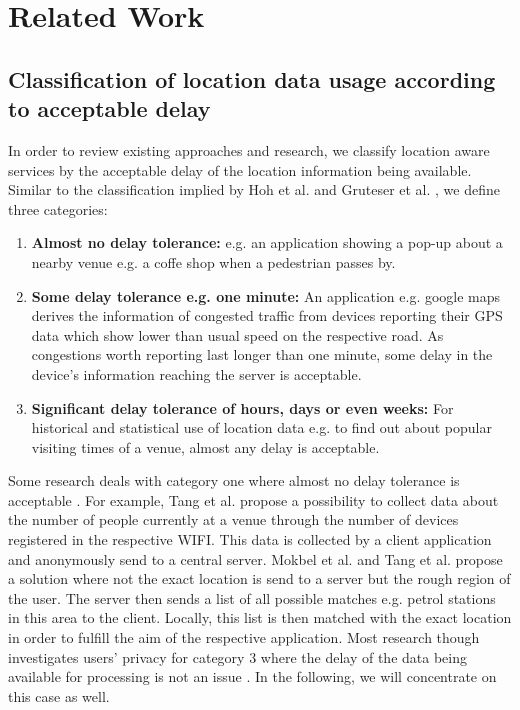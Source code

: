 \chapter{Related Work}\label{chapter:related-work}

\section{Classification of location data usage according to acceptable delay}
In order to review existing approaches and research, we classify location aware services by the acceptable delay of the location information being available. Similar to the classification implied by Hoh et al. \parencite{hoh2005protecting} and Gruteser et al. \parencite{gruteser2003anonymous}, we define three categories:
\begin{enumerate}
  \item \textbf{Almost no delay tolerance:} e.g. an application showing a pop-up about a nearby venue e.g. a coffe shop when a pedestrian passes by.
  \item \textbf{Some delay tolerance e.g. one minute:} An application e.g. google maps derives the information of congested traffic from devices reporting their GPS data which show lower than usual speed on the respective road. As congestions worth reporting last longer than one minute, some delay in the device's information reaching the server is acceptable.
  \item \textbf{Significant delay tolerance of hours, days or even weeks:} For historical and statistical use of location data e.g. to find out about popular visiting times of a venue, almost any delay is acceptable.
\end{enumerate}
Some research deals with category one where almost no delay tolerance is acceptable \parencite{location-privacy, mix-zones, tang2006putting}. For example, Tang et al. \parencite{tang2006putting} propose a possibility to collect data about the number of people currently at a venue through the number of devices registered in the respective WIFI. This data is collected by a client application and anonymously send to a central server. Mokbel et al. \parencite{casper} and Tang et al. \parencite{tang2006putting} propose a solution where not the exact location is send to a server but the rough region of the user. The server then sends a list of all possible matches e.g. petrol stations in this area to the client. Locally, this list is then matched with the exact location in order to fulfill the aim of the respective application.
Most research though investigates users' privacy for category 3 where the delay of the data being available for processing is not an issue \parencite{krumm, cellphone, privacy-home-work-pairs, twitter}. In the following, we will concentrate on this case as well.

